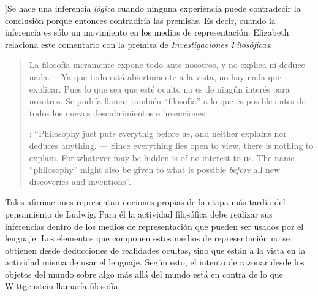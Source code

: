 ]{Se hace una inferencia \emph{lógica} cuando ninguna experiencia puede contradecir la conclusión porque entonces contradiría las premisas. Es decir, cuando la inferencia es sólo un movimiento en los medios de representación}.
Elizabeth relaciona este comentario con la premisa de \emph{Investigaciones Filosóficas}: \blockquote[{\Cite[\S126]{wittgenstein1953phiinv}}: \enquote{Philosophy just puts everythig before us, and neither explains nor deduces anything. --- Since everything lies open to view, there is nothing to explain. For whatever may be hidden is of no interest to us. The name ``philosophy'' might also be given to what is possible \emph{before} all new discoveries and inventions}.]{La filosofía meramente expone todo ante nosotros, y no explica ni deduce nada.\,---\,Ya que todo está abiertamente a la vista, no hay nada que explicar. Pues lo que sea que esté oculto no es de ningún interés para nosotros. Se podría llamar también ``filosofía'' a lo que es posible antes de todos los nuevos descubrimientos e invenciones}. Tales afirmaciones representan nociones propias de la etapa más tardía del pensamiento de Ludwig. Para él la actividad filosófica debe realizar sus inferencias dentro de los medios de representación que pueden ser usados por el lenguaje. Los elementos que componen estos medios de representación no se obtienen desde deducciones de realidades ocultas, sino que están a la vista en la actividad misma de usar el lenguaje. Según esto, el intento de razonar desde los objetos del mundo sobre algo más allá del mundo está en contra de lo que Wittgenstein llamaría filosofía.

